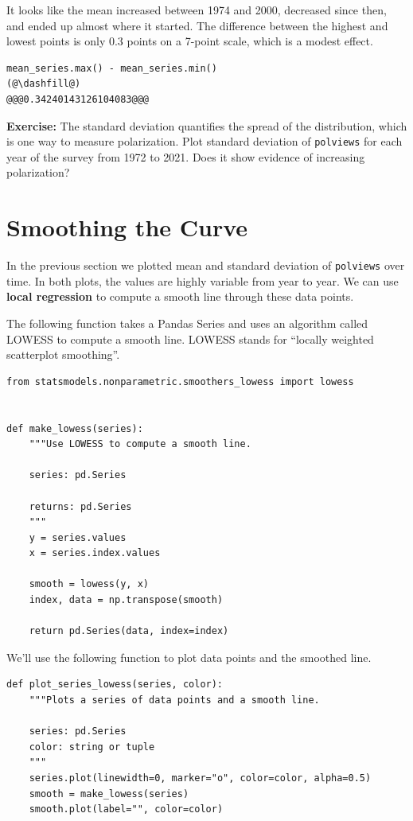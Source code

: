 It looks like the mean increased between 1974 and 2000, decreased since
then, and ended up almost where it started. The difference between the
highest and lowest points is only 0.3 points on a 7-point scale, which
is a modest effect.

\begin{lstlisting}[]
mean_series.max() - mean_series.min()
(@\dashfill@)
@@@0.34240143126104083@@@
\end{lstlisting}

\textbf{Exercise:} The standard deviation quantifies the spread of the
distribution, which is one way to measure polarization. Plot standard
deviation of \passthrough{\lstinline!polviews!} for each year of the
survey from 1972 to 2021. Does it show evidence of increasing
polarization?

\hypertarget{smoothing-the-curve}{%
\section{Smoothing the Curve}\label{smoothing-the-curve}}

In the previous section we plotted mean and standard deviation of
\passthrough{\lstinline!polviews!} over time. In both plots, the values
are highly variable from year to year. We can use \textbf{local
regression} to compute a smooth line through these data points.

The following function takes a Pandas Series and uses an algorithm
called LOWESS to compute a smooth line. LOWESS stands for ``locally
weighted scatterplot smoothing''.

\begin{lstlisting}[]
from statsmodels.nonparametric.smoothers_lowess import lowess


def make_lowess(series):
    """Use LOWESS to compute a smooth line.

    series: pd.Series

    returns: pd.Series
    """
    y = series.values
    x = series.index.values

    smooth = lowess(y, x)
    index, data = np.transpose(smooth)

    return pd.Series(data, index=index)
\end{lstlisting}

We'll use the following function to plot data points and the smoothed
line.

\begin{lstlisting}[]
def plot_series_lowess(series, color):
    """Plots a series of data points and a smooth line.

    series: pd.Series
    color: string or tuple
    """
    series.plot(linewidth=0, marker="o", color=color, alpha=0.5)
    smooth = make_lowess(series)
    smooth.plot(label="", color=color)
\end{lstlisting}

